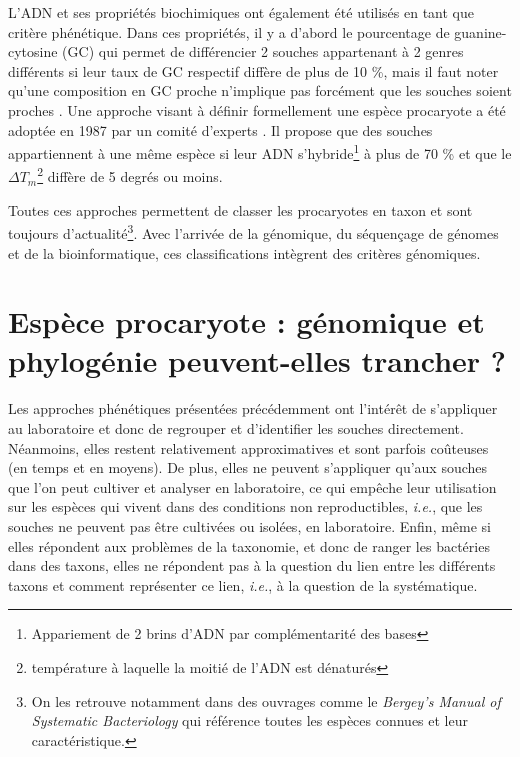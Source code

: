 L'ADN et ses propriétés biochimiques ont également été utilisés en tant que critère phénétique. Dans ces propriétés, il y a d'abord le pourcentage de guanine-cytosine (GC) qui permet de différencier 2 souches appartenant à 2 genres différents si leur taux de GC respectif diffère de plus de 10 \%, mais il faut noter qu'une composition en GC proche n'implique pas forcément que les souches soient proches \cite{schleifer_classification_2009}. 
Une approche visant à définir formellement une espèce procaryote a été adoptée en 1987 par un comité d'experts \cite{moore_report_1987}. Il propose que des souches appartiennent à une même espèce si leur ADN s'hybride\footnote{Appariement de 2 brins d'ADN par complémentarité des bases} à plus de 70 \% et que le $\Delta T_m$\footnote{température à laquelle la moitié de l'ADN est dénaturés} diffère de 5 degrés ou moins.

Toutes ces approches permettent de classer les procaryotes en taxon et sont toujours d'actualité\footnote{On les retrouve notamment dans des ouvrages comme le \textit{Bergey's Manual of Systematic Bacteriology} qui référence toutes les espèces connues et leur caractéristique.}. Avec l'arrivée de la génomique, du séquençage de génomes et de la bioinformatique, ces classifications intègrent des critères génomiques.

\section{Espèce procaryote : génomique et phylogénie peuvent-elles trancher ?}

Les approches phénétiques présentées précédemment ont l'intérêt de s'appliquer au laboratoire et donc de regrouper et d'identifier les souches directement. Néanmoins, elles restent relativement approximatives et sont parfois coûteuses (en temps et en moyens). De plus, elles ne peuvent s'appliquer qu'aux souches que l'on peut cultiver et analyser en laboratoire, ce qui empêche leur utilisation sur les espèces qui vivent dans des conditions non reproductibles, \textit{i.e.}, que les souches ne peuvent pas être cultivées ou isolées, en laboratoire. Enfin, même si elles répondent aux problèmes de la taxonomie, et donc de ranger les bactéries dans des taxons, elles ne répondent pas à la question du lien entre les différents taxons et comment représenter ce lien, \textit{i.e.}, à la question de la systématique. 

